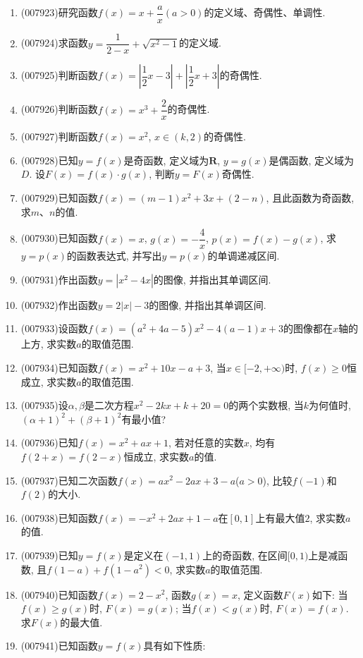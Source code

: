 \documentclass[10pt,a4paper]{article}
\begin{document}
\begin{enumerate}[1.]
\item {\tiny (007923)}研究函数$f(x)=x+\dfrac ax(a>0)$的定义域、奇偶性、单调性.
\item {\tiny (007924)}求函数$y=\dfrac 1{2-x}+\sqrt {x^2-1}$的定义域.
\item {\tiny (007925)}判断函数$f(x)=|\dfrac 12x-3|+|\dfrac 12x+3|$的奇偶性.
\item {\tiny (007926)}判断函数$f(x)=x^3+\dfrac 2x$的奇偶性.
\item {\tiny (007927)}判断函数$f(x)=x^2$, $x\in (k,2)$的奇偶性.
\item {\tiny (007928)}已知$y=f(x)$是奇函数, 定义域为$\mathbf{R}$, $y=g(x)$是偶函数, 定义域为$D$. 设$F(x)=f(x)\cdot g(x)$, 判断$y=F(x)$奇偶性.
\item {\tiny (007929)}已知函数$f(x)=(m-1)x^2+3x+(2-n)$, 且此函数为奇函数, 求$m$、$n$的值.
\item {\tiny (007930)}已知函数$f(x)=x$, $g(x)=-\dfrac 4x$, $p(x)=f(x)-g(x)$, 求$y=p(x)$的函数表达式, 并写出$y=p(x)$的单调递减区间.
\item {\tiny (007931)}作出函数$y=|x^2-4x|$的图像, 并指出其单调区间.
\item {\tiny (007932)}作出函数$y=2|x|-3$的图像, 并指出其单调区间.
\item {\tiny (007933)}设函数$f(x)=(a^2+4a-5)x^2-4(a-1)x+3$的图像都在$x$轴的上方, 求实数$a$的取值范围.
\item {\tiny (007934)}已知函数$f(x)=x^2+10x-a+3$, 当$x\in [-2,+\infty)$时, $f(x)\ge 0$恒成立, 求实数$a$的取值范围.
\item {\tiny (007935)}设$\alpha,\beta$是二次方程$x^2-2kx+k+20=0$的两个实数根, 当$k$为何值时, $(\alpha +1)^2+(\beta +1)^2$有最小值?
\item {\tiny (007936)}已知$f(x)=x^2+ax+1$, 若对任意的实数$x$, 均有$f(2+x)=f(2-x)$恒成立, 求实数$a$的值.
\item {\tiny (007937)}已知二次函数$f(x)=ax^2-2ax+3-a$($a>0$), 比较$f(-1)$和$f(2)$的大小.
\item {\tiny (007938)}已知函数$f(x)=-x^2+2ax+1-a$在$[0,1]$上有最大值$2$, 求实数$a$的值.
\item {\tiny (007939)}已知$y=f(x)$是定义在$(-1,1)$上的奇函数, 在区间$[0,1)$上是减函数, 且$f(1-a)+f(1-a^2)<0$, 求实数$a$的取值范围.
\item {\tiny (007940)}已知函数$f(x)=2-x^2$, 函数$g(x)=x$, 定义函数$F(x)$如下: 当$f(x)\ge g(x)$时, $F(x)=g(x)$; 当$f(x)<g(x)$时, $F(x)=f(x)$. 求$F(x)$的最大值.
\item {\tiny (007941)}已知函数$y=f(x)$具有如下性质:\\

\end{enumerate}
\end{document}

